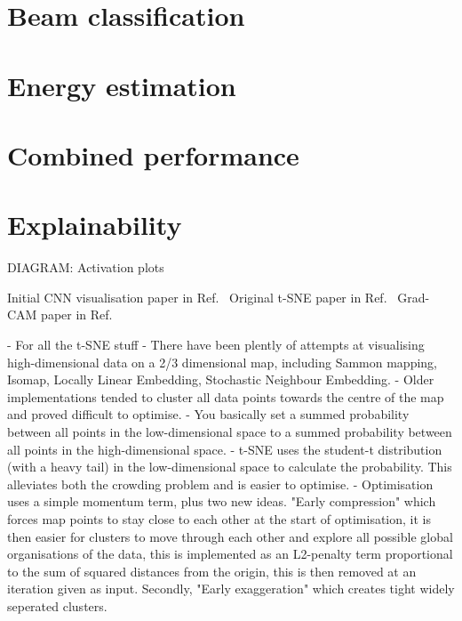 \section{Beam classification} %
\label{sec:cvn_beam} %

\section{Energy estimation} %
\label{sec:cvn_energy} %

\section{Combined performance} %
\label{sec:cvn_final} %

\section{Explainability} %
\label{sec:cvn_explain} %

DIAGRAM: Activation plots

Initial CNN visualisation paper in Ref.~\cite{zeiler2013}
Original t-SNE paper in Ref.~\cite{maaten2008}
Grad-CAM paper in Ref.~\cite{elvaraju2019}

- For all the t-SNE stuff
- There have been plently of attempts at visualising high-dimensional data on a 2/3 dimensional
map, including Sammon mapping, Isomap, Locally Linear Embedding, Stochastic Neighbour Embedding.
- Older implementations tended to cluster all data points towards the centre of the map and proved
difficult to optimise.
- You basically set a summed probability between all points in the low-dimensional space to a
summed probability between all points in the high-dimensional space.
- t-SNE uses the student-t distribution (with a heavy tail) in the low-dimensional space to
calculate the probability. This alleviates both the crowding problem and is easier to optimise.
- Optimisation uses a simple momentum term, plus two new ideas. "Early compression" which forces
map points to stay close to each other at the start of optimisation, it is then easier for
clusters to move through each other and explore all possible global organisations of the data,
this is implemented as an L2-penalty term proportional to the sum of squared distances from the
origin, this is then removed at an iteration given as input. Secondly, "Early exaggeration" which
creates tight widely seperated clusters.

